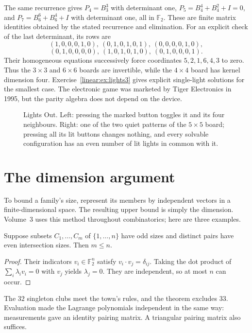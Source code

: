 The same recurrence gives $P_4=B_3^3$ with determinant one, $P_5=B_4^4+B_4^2+I=0$, and $P_7=B_6^6+B_6^4+I$ with determinant one, all in $\mathbb F_2$. These are finite matrix identities obtained by the stated recurrence and elimination. For an explicit check of the last determinant, its rows are
\[(1,0,0,0,1,0),\ (0,1,0,1,0,1),\ (0,0,0,0,1,0),\]
\[(0,1,0,0,0,0),\ (1,0,1,0,1,0),\ (0,1,0,0,0,1).
\]
Their homogeneous equations successively force coordinates $5,2,1,6,4,3$ to zero. Thus the $3\times3$ and $6\times6$ boards are invertible, while the $4\times4$ board has kernel dimension four. Exercise~\ref{linear:ex:lights3} gives explicit single-light solutions for the smallest case. The electronic game was marketed by Tiger Electronics in 1995, but the parity algebra does not depend on the device.
\begin{figure}[ht]
\centering
{}
\caption{Lights Out. Left: pressing the marked button toggles it and its four neighbours. Right: one of the two quiet
patterns of the $5\times5$ board; pressing all its lit buttons changes nothing, and every solvable configuration has an
even number of lit lights in common with it.}
\label{linear:fig:lightsout}
\end{figure}

\section{The dimension argument}\label{linear:sec:dimarg}

To bound a family's size, represent its members by independent vectors in a finite-dimensional space. The resulting upper bound is simply the dimension. Volume~3 uses this method throughout combinatorics; here are three examples.

\begin{theorem}\label{linear:thm:oddtown}
Suppose subsets $C_1,\ldots,C_m$ of $\{1,\ldots,n\}$ have odd sizes and distinct pairs have even intersection sizes. Then $m\le n$.
\end{theorem}
\begin{proof}
Their indicators $v_i\in\mathbb F_2^n$ satisfy $v_i\cdot v_j=\delta_{ij}$. Taking the dot product of $\sum_i\lambda_iv_i=0$ with $v_j$ yields $\lambda_j=0$. They are independent, so at most $n$ can occur.
\end{proof}

The $32$ singleton clubs meet the town's rules, and the theorem excludes $33$. Evaluation made the Lagrange polynomials independent in the same way: measurements gave an identity pairing matrix. A triangular pairing matrix also suffices.


